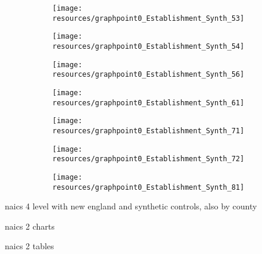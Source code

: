 \documentclass[12pt]{article}
\begin{document}
\begin{figure}[H]
	\centering
	\begin{subfigure}[b]{0.4\textwidth}
	    \texttt{[image: resources/graphpoint0\_Establishment\_Synth\_53]}
	\end{subfigure}
	\begin{subfigure}[b]{0.4\textwidth}
		  \texttt{[image: resources/graphpoint0\_Establishment\_Synth\_54]}
	\end{subfigure}
\end{figure}

\begin{figure}[H]
	\centering
	\begin{subfigure}[b]{0.4\textwidth}
	    \texttt{[image: resources/graphpoint0\_Establishment\_Synth\_56]}
	\end{subfigure}
	\begin{subfigure}[b]{0.4\textwidth}
		  \texttt{[image: resources/graphpoint0\_Establishment\_Synth\_61]}
	\end{subfigure}
\end{figure}

\begin{figure}[H]
	\centering
	\begin{subfigure}[b]{0.4\textwidth}
	    \texttt{[image: resources/graphpoint0\_Establishment\_Synth\_71]}
	\end{subfigure}
	\begin{subfigure}[b]{0.4\textwidth}
		  \texttt{[image: resources/graphpoint0\_Establishment\_Synth\_72]}
	\end{subfigure}
\end{figure}

\begin{figure}[H]
	\centering
	\begin{subfigure}[b]{0.4\textwidth}
	    \texttt{[image: resources/graphpoint0\_Establishment\_Synth\_81]}
	\end{subfigure}
\end{figure}


\pagebreak


naics 4 level with new england and synthetic controls, also by county

\pagebreak

naics 2 charts

\pagebreak

naics 2 tables

\pagebreak
\end{document}
